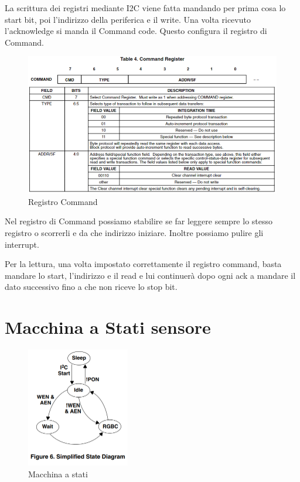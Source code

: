 \documentclass[12pt]{report}
\begin{document}
La scrittura dei registri mediante I2C viene fatta mandando per prima cosa lo start bit, poi l'indirizzo della periferica e il write. Una volta ricevuto l'acknowledge si manda il Command code. Questo configura il registro di Command.

\begin{figure}
    \includegraphics[width=\textwidth]{Immagini_sensore/registro_di_command.png}
    \caption{Registro Command}
    \label{fig:comm}
\end{figure}

Nel registro di Command possiamo stabilire se far leggere sempre lo stesso registro o scorrerli e da che indirizzo iniziare. Inoltre possiamo pulire gli interrupt.

Per la lettura, una volta impostato correttamente il registro command, basta mandare lo start, l'indirizzo e il read e lui continuerà dopo ogni ack a mandare il dato successivo fino a che non riceve lo stop bit.

\section{Macchina a Stati sensore}
\begin{figure}
    \centering
    \includegraphics[width=0.4\textwidth]{Immagini_sensore/macchina_a_stati.png}
    \caption{Macchina a stati}
\end{figure}
\end{document}
